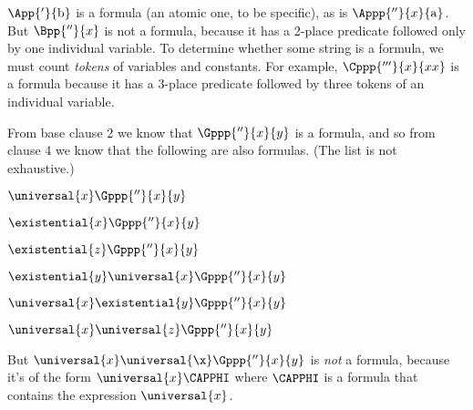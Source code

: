 \noindent{}$\App{'}{\constant{b}}$ is a formula (an atomic one, to be specific), as is $\Appp{''}{\variable{x}}{\constant{a}}$. 
But $\Bpp{''}{\variable{x}}$ is not a formula, because it has a 2-place predicate followed only by one individual variable. 
To determine whether some string is a formula, we must count \emph{tokens} of variables and constants. 
For example, $\Cppp{'''}{\variable{x}}{\variable{x}\variable{x}}$ is a formula because it has a 3-place predicate followed by three tokens of an individual variable.

From base clause 2 we know that $\Gppp{''}{\variable{x}}{\variable{y}}$ is a formula, and so from clause 4 we know that the following are also formulas. 
(The list is not exhaustive.) 
\begin{multicols}{2}
\begin{menumerate}
\item $\universal{\variable{x}}\Gppp{''}{\variable{x}}{\variable{y}}$ 
\item $\existential{\variable{x}}\Gppp{''}{\variable{x}}{\variable{y}}$ 
\item $\existential{\variable{z}}\Gppp{''}{\variable{x}}{\variable{y}}$
\item $\existential{\variable{y}}\universal{\variable{x}}\Gppp{''}{\variable{x}}{\variable{y}}$ 
\item $\universal{\variable{x}}\existential{\variable{y}}\Gppp{''}{\variable{x}}{\variable{y}}$ 
\item $\universal{\variable{x}}\universal{\variable{z}}\Gppp{''}{\variable{x}}{\variable{y}}$ 
\end{menumerate}
\end{multicols}
\noindent{}But $\universal{\variable{x}}\universal{\x}\Gppp{''}{\variable{x}}{\variable{y}}$ is \emph{not} a formula, because it's of the form $\universal{\variable{x}}\CAPPHI$ where $\CAPPHI$ is a formula that contains the expression $\universal{\variable{x}}$.

